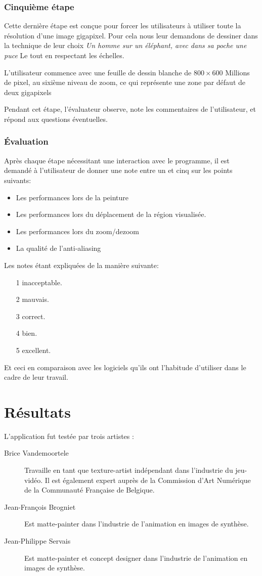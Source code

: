 			\subsubsection{Cinquième étape}
			Cette dernière étape est conçue pour forcer les utilisateurs à utiliser toute la résolution d'une image
			gigapixel. Pour cela nous leur demandons de dessiner dans la technique de leur choix \emph{Un homme sur
			un éléphant, avec dans sa poche une puce} Le tout en respectant les échelles. 

			L'utilisateur commence avec une feuille de dessin blanche de $800 \times 600$ Millions de pixel, au sixième
			niveau de zoom, ce qui représente une zone par défaut de deux gigapixels

			Pendant cet étape, l'évaluateur observe, note les commentaires de l'utilisateur, et répond aux questions
			éventuelles. 

			\subsubsection{Évaluation}
			Après chaque étape nécessitant une interaction avec le programme, il est demandé à l'utilisateur de donner
			une note entre un et cinq sur les points suivants:
			\begin{itemize}
				\item Les performances lors de la peinture
				\item Les performances lors du déplacement de la région visualisée.
				\item Les performances lors du zoom/dezoom
				\item La qualité de l'anti-aliasing
			\end{itemize}
			Les notes étant expliquées de la manière suivante:
			\begin{enumerate}
				\item[1] inacceptable.
				\item[2] mauvais.
				\item[3] correct.
				\item[4] bien.
				\item[5] excellent.
			\end{enumerate}
			Et ceci en comparaison avec les logiciels qu'ils ont l'habitude d'utiliser dans le cadre de leur travail. 
	\section{Résultats}
		L'application fut testée par trois artistes :
		\begin{description}
			\item[Brice Vandemoortele] Travaille en tant que texture-artist indépendant dans l'industrie du jeu-vidéo. Il est également
			expert auprès de la Commission d'Art Numérique de la Communauté Française de Belgique. 
			\item[Jean-François Brogniet] Est matte-painter dans l'industrie de l'animation en images de synthèse.
			\item[Jean-Philippe Servais] Est matte-painter et concept designer dans l'industrie de l'animation en images de synthèse. 
		\end{description}
		
